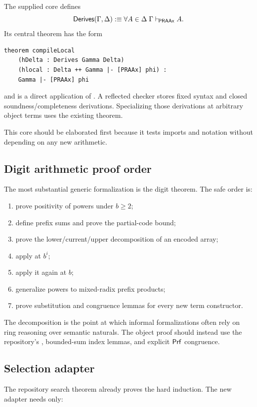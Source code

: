 The supplied core defines
\[
 \mathsf{Derives}(\Gamma,\Delta)
  :\equiv \forall A\in\Delta\;\Gamma\mathrel{\vdash_{\!\mathsf{PRAAx}}} A.
\]
Its central theorem has the form
\begin{lstlisting}[language=Lean]
theorem compileLocal
    (hDelta : Derives Gamma Delta)
    (hlocal : Delta ++ Gamma |- [PRAAx] phi) :
    Gamma |- [PRAAx] phi
\end{lstlisting}
and is a direct application of .  A reflected checker
stores fixed syntax and closed soundness/completeness derivations.  Specializing
those derivations at arbitrary object terms uses the existing
 theorem.

This core should be elaborated first because it tests imports and notation
without depending on any new arithmetic.

\subsection{Digit arithmetic proof order}

The most substantial generic formalization is the digit theorem.  The safe
order is:

\begin{enumerate}
\item prove positivity of powers under \(b\ge2\);
\item define prefix sums and prove the partial-code bound;
\item prove the lower/current/upper decomposition of an encoded array;
\item apply  at \(b^i\);
\item apply it again at \(b\);
\item generalize powers to mixed-radix prefix products;
\item prove substitution and congruence lemmas for every new term constructor.
\end{enumerate}

The decomposition is the point at which informal formalizations often rely on
ring reasoning over semantic naturals.  The object proof should instead use the
repository's , bounded-sum index lemmas, and explicit
\(\mathsf{Prf}\) congruence.

\subsection{Selection adapter}

The repository search theorem already proves the hard induction.  The new
adapter needs only:

